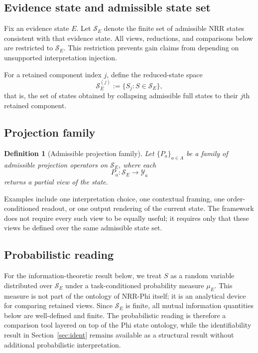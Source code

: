 \documentclass[11pt,a4paper]{article}
\newtheorem{definition}{Definition}
\begin{document}
\subsection{Evidence state and admissible state set}

Fix an evidence state $E$. Let $\mathcal{S}_E$ denote the finite set of admissible NRR states consistent with that evidence state. All views, reductions, and comparisons below are restricted to $\mathcal{S}_E$. This restriction prevents gain claims from depending on unsupported interpretation injection.

For a retained component index $j$, define the reduced-state space
\begin{equation}
\mathcal{S}_E^{(j)} := \{S_j : S \in \mathcal{S}_E\},
\end{equation}
that is, the set of states obtained by collapsing admissible full states to their $j$th retained component.

\subsection{Projection family}

\begin{definition}[Admissible projection family]
Let $\{P_a\}_{a \in A}$ be a family of admissible projection operators on $\mathcal{S}_E$, where each
\begin{equation}
P_a : \mathcal{S}_E \to \mathcal{Y}_a
\end{equation}
returns a partial view of the state.
\end{definition}

Examples include one interpretation choice, one contextual framing, one order-conditioned readout, or one output rendering of the current state. The framework does not require every such view to be equally useful; it requires only that these views be defined over the same admissible state set.

\subsection{Probabilistic reading}

For the information-theoretic result below, we treat $S$ as a random variable distributed over $\mathcal{S}_E$ under a task-conditioned probability measure $\mu_E$. This measure is not part of the ontology of NRR-Phi \cite{saito2026phi} itself; it is an analytical device for comparing retained views. Since $\mathcal{S}_E$ is finite, all mutual information quantities below are well-defined and finite. The probabilistic reading is therefore a comparison tool layered on top of the Phi state ontology, while the identifiability result in Section~\ref{sec:ident} remains available as a structural result without additional probabilistic interpretation.
\end{document}
